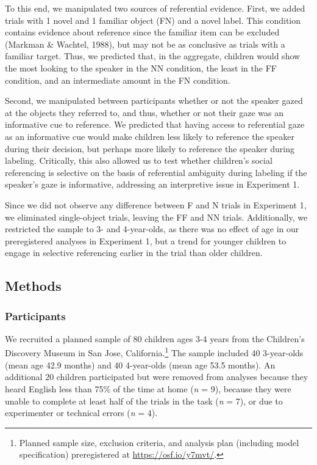 \documentclass[a4paper,man,apacite,floatsintext]{apa6}
\begin{document}
To this end, we manipulated two sources of referential evidence. First,
we added trials with 1 novel and 1 familiar object (FN) and a novel
label. This condition contains evidence about reference since the
familiar item can be excluded (Markman \& Wachtel, 1988), but may not be
as conclusive as trials with a familiar target. Thus, we predicted that,
in the aggregate, children would show the most looking to the speaker in
the NN condition, the least in the FF condition, and an intermediate
amount in the FN condition.

Second, we manipulated between participants whether or not the speaker
gazed at the objects they referred to, and thus, whether or not their
gaze was an informative cue to reference. We predicted that having
access to referential gaze as an informative cue would make children
less likely to reference the speaker during their decision, but perhaps
more likely to reference the speaker during labeling. Critically, this
also allowed us to test whether children's social referencing is
selective on the basis of referential ambiguity during labeling if the
speaker's gaze is informative, addressing an interpretive issue in
Experiment 1.

Since we did not observe any difference between F and N trials in
Experiment 1, we eliminated single-object trials, leaving the FF and NN
trials. Additionally, we restricted the sample to 3- and 4-year-olds, as
there was no effect of age in our preregistered analyses in Experiment
1, but a trend for younger children to engage in selective referencing
earlier in the trial than older children.

\subsection{Methods}\label{methods-1}

\subsubsection{Participants}\label{participants-1}

We recruited a planned sample of 80 children ages 3-4 years from the
Children's Discovery Museum in San Jose, California.\footnote{Planned
  sample size, exclusion criteria, and analysis plan (including model
  specification) preregistered at \url{https://osf.io/y7mvt/}.} The
sample included 40 3-year-olds (mean age 42.9 months) and 40 4-year-olds
(mean age 53.5 months). An additional 20 children participated but were
removed from analyses because they heard English less than 75\% of the
time at home (\emph{n} = 9), because they were unable to complete at
least half of the trials in the task (\emph{n} = 7), or due to
experimenter or technical errors (\emph{n} = 4).
\end{document}
